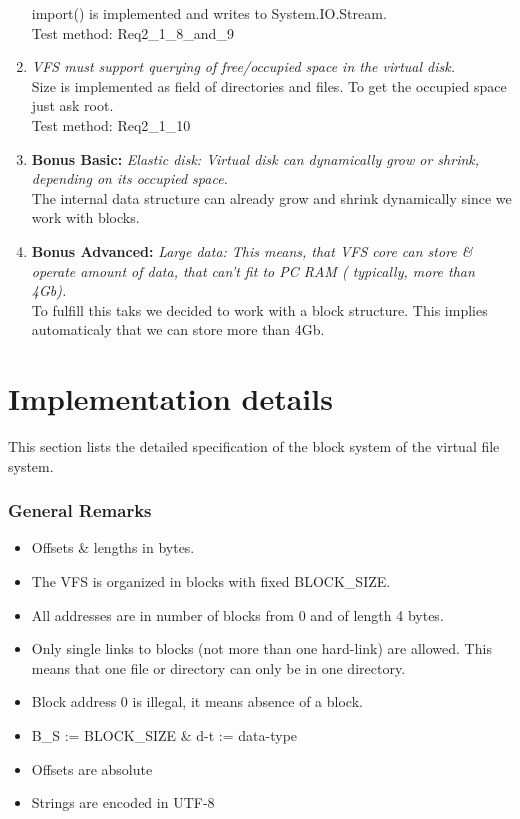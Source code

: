 \documentclass[a4paper,12pt]{article}
\begin{document}
\begin{enumerate}
		import() is implemented and writes to System.IO.Stream.\\
		Test method: Req2\_1\_8\_and\_9
	\item \emph{VFS must support querying of free/occupied space in the virtual disk.}\\
		Size is implemented as field of directories and files. To get the occupied space just ask root.\\
		Test method: Req2\_1\_10
	\item \textbf{Bonus Basic:} \emph{Elastic disk: Virtual disk can dynamically grow or shrink, depending on its occupied space.}\\
		The internal data structure can already grow and shrink dynamically since we work with blocks.
	\item \textbf{Bonus Advanced:} \emph{Large data: This means, that VFS core can store \& operate amount of data, that can't fit to PC RAM ( typically, more than 4Gb).}\\
		To fulfill this taks we decided to work with a block structure. This implies automaticaly that we can store more than 4Gb.\\
\end{enumerate}

\section{Implementation details}\label{sct:impl}

This section lists the detailed specification of the block system of the virtual file system.

\subsubsection{General Remarks}

\begin{itemize}
	\item Offsets \& lengths in bytes.
	\item The VFS is organized in blocks with fixed BLOCK\_SIZE.
	\item All addresses are in number of blocks from 0 and of length 4 bytes.
	\item Only single links to blocks (not more than one hard-link) are allowed. This means that one file or directory can only be in one directory.
	\item Block address 0 is illegal, it means absence of a block.
	\item B\_S := BLOCK\_SIZE \& d-t := data-type
	\item Offsets are absolute
	\item Strings are encoded in UTF-8
\end{itemize}
\end{document}
